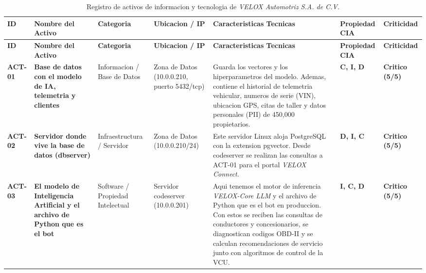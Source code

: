 \documentclass[letterpaper,11pt]{article}
\begin{document}
\vspace{0.2cm}
\begingroup
\scriptsize
\setlength{\tabcolsep}{4pt}
\renewcommand{\arraystretch}{1.28}
\noindent
\begin{longtable}{|C{1.2cm}|L{2.75cm}|L{1.8cm}|L{2.15cm}|L{4.85cm}|C{1.55cm}|C{1.6cm}|}
\caption{Registro de activos de informacion y tecnologia de \textit{VELOX Automotriz S.A. de C.V.}}
\label{tab:registro-activos} \\
\hline
{}
\textbf{ID}
  & \textbf{Nombre del Activo}
  & \textbf{Categoria}
  & \textbf{Ubicacion / IP}
  & \textbf{Caracteristicas Tecnicas}
  & \textbf{Propiedad CIA}
  & \textbf{Criticidad} \\
\hline
\endfirsthead
\hline
{}
\textbf{ID}
  & \textbf{Nombre del Activo}
  & \textbf{Categoria}
  & \textbf{Ubicacion / IP}
  & \textbf{Caracteristicas Tecnicas}
  & \textbf{Propiedad CIA}
  & \textbf{Criticidad} \\
\hline
\endhead
\hline
\endlastfoot

\textbf{ACT-01}
  & \textbf{Base de datos con el modelo de IA, telemetria y clientes}
  & Informacion / Base de Datos
  & Zona de Datos (10.0.0.210, puerto 5432/tcp)
  & Guarda los vectores y los hiperparametros del modelo. Ademas,
contiene el historial de telemetria vehicular, numeros de serie
(VIN), ubicacion GPS, citas de taller y datos personales (PII) de
450,000 propietarios.
  & \textbf{C, I, D}
  & \textbf{Critico (5/5)} \\
\hline

\textbf{ACT-02}
  & \textbf{Servidor donde vive la base de datos (dbserver)}
  & Infraestruc\-tura / Servidor
  & Zona de Datos (10.0.0.210/24)
  & Este servidor Linux aloja PostgreSQL con la extension pgvector.
Desde codeserver se realizan las consultas a ACT-01 para el portal
\textit{VELOX Connect}.
  & \textbf{D, I, C}
  & \textbf{Critico (5/5)} \\
\hline

\textbf{ACT-03}
  & \textbf{El modelo de Inteligencia Artificial y el archivo de Python
que es el bot}
  & Software / Propiedad Intelectual
  & Servidor codeserver (10.0.0.201)
  & Aqui tenemos el motor de inferencia \textit{VELOX-Core LLM} y el
archivo de Python que es el bot en produccion. Con estos se reciben
las consultas de conductores y concesionarios, se diagnostican
codigos OBD-II y se calculan recomendaciones de servicio junto con
algoritmos de control de la VCU.
  & \textbf{I, C, D}
  & \textbf{Critico (5/5)} \\
\hline


\end{longtable}
\end{document}
